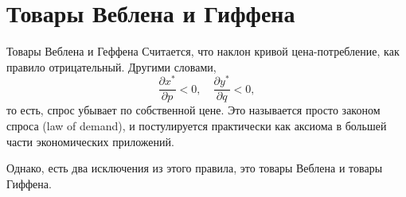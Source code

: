 \documentclass{beamer}
\begin{document}
\section{Товары Веблена и Гиффена}

\begin{frame}{Товары Веблена и Геффена}
Считается, что наклон кривой цена-потребление, как правило отрицательный. Другими словами, $$\frac{\partial x^*}{\partial p} <0, \quad \frac{\partial y^*}{\partial q} <0,$$
то есть, спрос убывает по собственной цене. Это называется просто \alert{законом спроса} (law of demand), и постулируется практически как аксиома в большей части экономических приложений.

Однако, есть два исключения из этого правила, это \alert{товары Веблена} и \alert{товары Гиффена}.
\end{frame}
\end{document}
